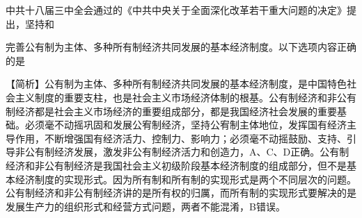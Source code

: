 \question 中共十八届三中全会通过的《中共中央关于全面深化改革若干重大问题的决定》提出，坚持和

完善公有制为主体、多种所有制经济共同发展的基本经济制度。以下选项内容正确的是
\par{}
\begin{solution}【简析】公有制为主体、多种所有制经济共同发展的基本经济制度，是中国特色社会主义制度的重要支柱，也是社会主义市场经济体制的根基。公有制经济和非公有制经济都是社会主义市场经济的重要组成部分，都是我国经济社会发展的重要基础。必须毫不动摇巩固和发展公宥制经济，坚持公宥制主体地位，发挥国有经济主导作用，不断增强国有经济活力、控制力、影响力；必须毫不动摇鼓励、支持、引导非公有制经济发展，激发非公有制经济活力和创造力，A、C、D正确。公有制经济和非公有制经济是我国社会主义初级阶段基本经济制度的组成部分，但不是基本经济制度的实现形式。因为所有制和所有制的实现形式是两个不同层次的问题。公有制经济和非公有制经济讲的是所有权的归厲，而所有制的实现形式要解决的是发展生产力的组织形式和经营方式问题，两者不能混淆，B错误。
\end{solution}
